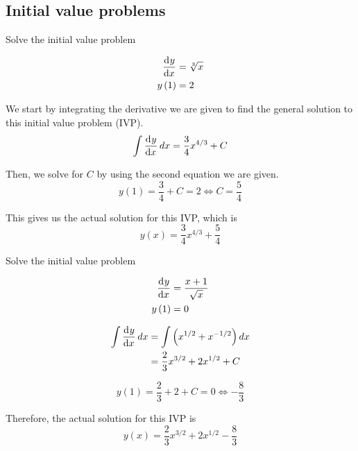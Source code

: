 \documentclass[a4paper, titlepage]{article}
\begin{document}
\subsection{Initial value problems}

\begin{Exercise}

Solve the initial value problem

    \begin{align*}
        \dod{y}{x} &= \sqrt[3]{x} \\
        y \left( 1 \right) &= 2
    \end{align*}
    \cite{anton-bivens-davis}
\end{Exercise}

\begin{Answer}
    We start by integrating the derivative we are given to find the general solution to this initial value problem (IVP).
    \[\int \dod{y}{x} dx = \frac{3}{4}x^{4/3} + C\]

    Then, we solve for \(C\) by using the second equation we are given.
    \[y \left( 1 \right) = \frac{3}{4} + C = 2 \iff C = \frac{5}{4}\]

    This gives us the actual solution for this IVP, which is
    \[y \left( x \right) = \frac{3}{4}x^{4/3} + \frac{5}{4}\]
\end{Answer}

\begin{Exercise}

Solve the initial value problem

    \begin{align*}
        \dod{y}{x} &= \frac{x + 1}{\sqrt{x}} \\
        y \left( 1 \right) &= 0
    \end{align*}
    \cite{anton-bivens-davis}
\end{Exercise}

\begin{Answer}
    \begin{align*}
	    \int \dod{y}{x} dx &= \int \left( x^{1/2} + x^{-1/2} \right) dx \\
	    &= \frac{2}{3}x^{3/2} + 2x^{1/2} + C
    \end{align*}

    \[y \left( 1 \right) = \frac{2}{3} + 2 + C = 0 \iff -\frac{8}{3} \]

    Therefore, the actual solution for this IVP is
    \[y \left( x \right) = \frac{2}{3}x^{3/2} + 2x^{1/2} - \frac{8}{3}\]
\end{Answer}
\end{document}
